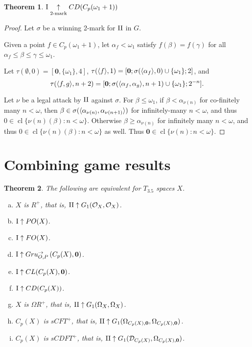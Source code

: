 \documentclass[11pt]{article}
\theoremstyle{plain}
\newtheorem{theorem}{Theorem}
\theoremstyle{definition}
\theoremstyle{remark}
\theoremstyle{plain}
\theoremstyle{definition}
\theoremstyle{remark}
\begin{document}
\begin{theorem}
  \(\mathrm{I}\underset{2\text{-mark}}{\uparrow}CD(C_p(\omega_1+1))\)
\end{theorem}
\begin{proof}
  Let \(\sigma\) be a winning 2-mark for \(\mathrm{II}\) in \(G\).

  Given a point \(f\in C_p(\omega_1+1)\),
  let \(\alpha_f<\omega_1\) satisfy \(f(\beta)=f(\gamma)\) for all
  \(\alpha_f\leq\beta\leq\gamma\leq\omega_1\).

  Let \(\tau(\emptyset,0)=[\mathbf{0},\{\omega_1\},4]\),
  \(\tau(\langle f\rangle,1)=[\mathbf{0};\sigma(\langle\alpha_f\rangle,0)\cup\{\omega_1\};2]\), and
  \[\tau(\langle f,g\rangle,n+2)=[\mathbf{0};\sigma(\langle\alpha_f,\alpha_g\rangle,n+1)\cup\{\omega_1\};2^{-n}].\]

  Let \(\nu\) be a legal attack by \(\mathrm{II}\) against \(\sigma\).
  For \(\beta\leq\omega_1\), if \(\beta<\alpha_{\nu(n)}\)
  for co-finitely many \(n<\omega\), then
  \(\beta\in\sigma(\langle\alpha_{\nu(n)},\alpha_{\nu(n+1)}\rangle)\) for
  infinitely-many \(n<\omega\), and thus \(0\in\operatorname{cl}\{\nu(n)(\beta):n<\omega\}\).
  Otherwise \(\beta\geq\alpha_{\nu(n)}\) for infinitely many \(n<\omega\),
  and thus \(0\in\operatorname{cl}\{\nu(n)(\beta):n<\omega\}\) as well.
  Thus \(\mathbf{0}\in\operatorname{cl}\{\nu(n):n<\omega\}\).
\end{proof}

\section{Combining game results}

\begin{theorem}
The following are equivalent for \(T_{3.5}\) spaces \(X\).
\begin{enumerate}[a)]
\item \(X\) is \(R^+\), that is, \(\mathrm{II}\uparrow G_{1}(\mathcal{O}_X,\mathcal{O}_X)\).
\item \(\mathrm{I}\uparrow PO(X)\). 
\item \(\mathrm{I}\uparrow FO(X)\).
\item \(\mathrm{I}\uparrow Gru_{O,P}^{\to}\left({C_p(X)},{\mathbf 0}\right)\).
\item \(\mathrm{I}\uparrow CL(C_p(X),\mathbf 0)\).
\item \(\mathrm{I}\uparrow CD(C_p(X))\).
\item \(X\) is \(\Omega R^+\), that is, 
  \(\mathrm{II}\uparrow G_{1}(\Omega_X,\Omega_X)\).
\item \(C_p(X)\) is \(sCFT^+\), that is, 
  \(\mathrm{II}\uparrow G_{1}(\Omega_{C_p(X),\mathbf 0},\Omega_{C_p(X),\mathbf 0})\).
\item \(C_p(X)\) is \(sCDFT^+\), that is,
  \(\mathrm{II}\uparrow G_{1}(\mathcal{D}_{C_p(X)},\Omega_{C_p(X),\mathbf 0})\).
\end{enumerate}
\end{theorem}
\end{document}
